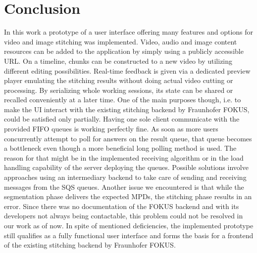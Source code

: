\documentclass[conference]{IEEEtran}
\begin{document}
\section{Conclusion}
In this work a prototype of a user interface offering many features and options for video and image stitching was implemented.
Video, audio and image content resources can be added to the application by simply using a publicly accessible URL.
On a timeline, chunks can be constructed to a new video by utilizing different editing possibilities.
Real-time feedback is given via a dedicated preview player emulating the stitching results without doing actual video cutting or processing.
By serializing whole working sessions, its state can be shared or recalled conveniently at a later time.
One of the main purposes though, i.e. to make the UI interact with the existing stitching backend by Fraunhofer FOKUS, could be satisfied only partially.
Having one sole client communicate with the provided FIFO queues is working perfectly fine.
As soon as more users concurrently attempt to poll for answers on the result queue, that queue becomes a bottleneck even though a more beneficial long polling method is used.
The reason for that might be in the implemented receiving algorithm or in the load handling capability of the server deploying the queues.
Possible solutions involve approaches using an intermediary backend to take care of sending and receiving messages from the SQS queues.
Another issue we encountered is that while the segmentation phase delivers the expected MPDs, the stitching phase results in an error.
Since there was no documentation of the FOKUS backend and with its developers not always being contactable, this problem could not be resolved in our work as of now.
In spite of mentioned deficiencies, the implemented prototype still qualifies as a fully functional user interface and forms the basis for a frontend of the existing stitching backend by Fraunhofer FOKUS.
\end{document}
